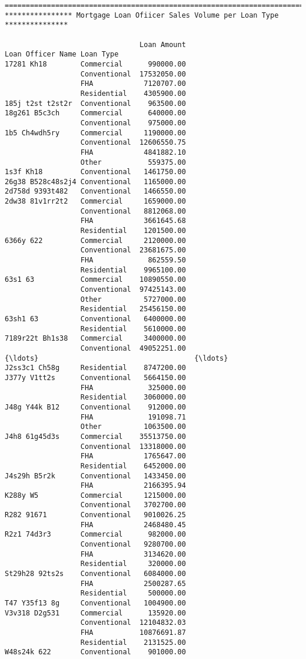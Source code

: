 \documentclass[11pt]{article}
\begin{document}
    \begin{Verbatim}[commandchars=\\\{\}]
==============================================================================
**************** Mortgage Loan Ofiicer Sales Volume per Loan Type ***************
 
                                Loan Amount
Loan Officer Name Loan Type                
17281 Kh18        Commercial      990000.00
                  Conventional  17532050.00
                  FHA            7120707.00
                  Residential    4305900.00
185j t2st t2st2r  Conventional    963500.00
18g261 B5c3ch     Commercial      640000.00
                  Conventional    975000.00
1b5 Ch4wdh5ry     Commercial     1190000.00
                  Conventional  12606550.75
                  FHA            4841882.10
                  Other           559375.00
1s3f Kh18         Conventional   1461750.00
26g38 B528c48s2j4 Conventional   1165000.00
2d758d 9393t482   Conventional   1466550.00
2dw38 81v1rr2t2   Commercial     1659000.00
                  Conventional   8812068.00
                  FHA            3661645.68
                  Residential    1201500.00
6366y 622         Commercial     2120000.00
                  Conventional  23681675.00
                  FHA             862559.50
                  Residential    9965100.00
63s1 63           Commercial    10890550.00
                  Conventional  97425143.00
                  Other          5727000.00
                  Residential   25456150.00
63sh1 63          Conventional   6400000.00
                  Residential    5610000.00
7189r22t Bh1s38   Commercial     3400000.00
                  Conventional  49052251.00
{\ldots}                                     {\ldots}
J2ss3c1 Ch58g     Residential    8747200.00
J377y V1tt2s      Conventional   5664150.00
                  FHA             325000.00
                  Residential    3060000.00
J48g Y44k B12     Conventional    912000.00
                  FHA             191098.71
                  Other          1063500.00
J4h8 61g45d3s     Commercial    35513750.00
                  Conventional  13318000.00
                  FHA            1765647.00
                  Residential    6452000.00
J4s29h B5r2k      Conventional   1433450.00
                  FHA            2166395.94
K288y W5          Commercial     1215000.00
                  Conventional   3702700.00
R282 91671        Conventional   9010026.25
                  FHA            2468480.45
R2z1 74d3r3       Commercial      982000.00
                  Conventional   9280700.00
                  FHA            3134620.00
                  Residential     320000.00
St29h28 92ts2s    Conventional   6084000.00
                  FHA            2500287.65
                  Residential     500000.00
T47 Y35f13 8g     Conventional   1004900.00
V3v318 D2g531     Commercial      135920.00
                  Conventional  12104832.03
                  FHA           10876691.87
                  Residential    2131525.00
W48s24k 622       Conventional    901000.00


\end{Verbatim}
\end{document}
